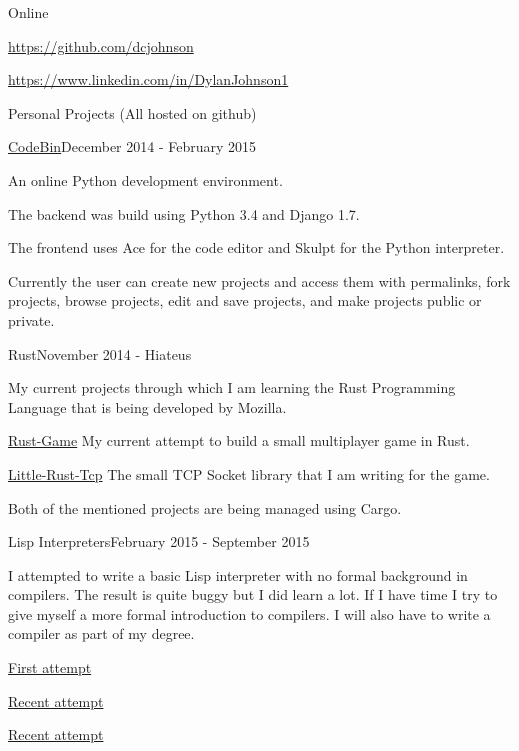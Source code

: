 \documentclass{resume} %
\begin{document}
\begin{rSection}{Online}
	\item {\href{https://github.com/dcjohnson}{https://github.com/dcjohnson}}
	\item {\href{https://www.linkedin.com/in/DylanJohnson1}{https://www.linkedin.com/in/DylanJohnson1}}
\end{rSection}

\begin{rSection}{Personal Projects (All hosted on github)}

\begin{rSubsection}{\href{https://github.com/dcjohnson/CodeBin}{CodeBin}}{December 2014 - February 2015}{}{}
	\item An online Python development environment.
	\item The backend was build using Python 3.4 and Django 1.7.
	\item The frontend uses Ace for the code editor and Skulpt for the Python interpreter.
	\item Currently the user can create new projects and access them with permalinks, fork projects, browse projects, edit and save projects, and make projects public or private.
\end{rSubsection}

\begin{rSubsection}{Rust}{November 2014 - Hiateus}{}{}
	\item My current projects through which I am learning the Rust Programming Language that is being developed by Mozilla.
	\item {\href{https://github.com/dcjohnson/Rust-Game}{Rust-Game}} My current attempt to build a small multiplayer game in Rust.
	\item {\href{https://github.com/dcjohnson/Little-Rust-Tcp}{Little-Rust-Tcp}} The small TCP Socket library that I am writing for the game.
	\item Both of the mentioned projects are being managed using Cargo.
\end{rSubsection}

\begin{rSubsection}{Lisp Interpreters}{February 2015 - September 2015}{}{}
	\item I attempted to write a basic Lisp interpreter with no formal background in compilers. The result is quite buggy but I did learn a lot. If I have time I try to give myself a more formal introduction to compilers. I will also have to write a compiler as part of my degree.
	\item {\href{https://github.com/dcjohnson/hackit}{First attempt}}
	\item {\href{https://github.com/dcjohnson/hackit-v2}{Recent attempt}}
	\item {\href{https://github.com/dcjohnson/libhackit-v2}{Recent attempt}}
\end{rSubsection}

\end{rSection}
\end{document}
